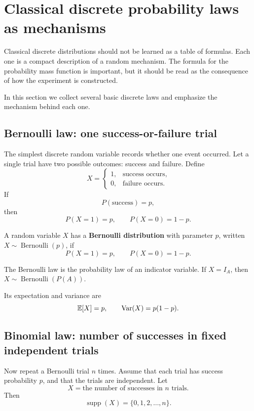 \section{Classical discrete probability laws as mechanisms}

Classical discrete distributions should not be learned as a table of formulas.
Each one is a compact description of a random mechanism. The formula for the
probability mass function is important, but it should be read as the consequence
of how the experiment is constructed.

In this section we collect several basic discrete laws and emphasize the
mechanism behind each one.

\subsection*{Bernoulli law: one success-or-failure trial}

The simplest discrete random variable records whether one event occurred. Let a
single trial have two possible outcomes: success and failure. Define
\[
X=
\begin{cases}
1, & \text{success occurs},\\
0, & \text{failure occurs}.
\end{cases}
\]
If
\[
P(\text{success})=p,
\]
then
\[
P(X=1)=p,\qquad P(X=0)=1-p.
\]

\begin{definitionbox}
A random variable \(X\) has a \textbf{Bernoulli distribution} with parameter
\(p\), written \(X\sim\operatorname{Bernoulli}(p)\), if
\[
P(X=1)=p,\qquad P(X=0)=1-p.
\]
\end{definitionbox}

The Bernoulli law is the probability law of an indicator variable. If \(X=I_A\),
then \(X\sim\operatorname{Bernoulli}(P(A))\).

Its expectation and variance are
\[
\mathbb{E}[X]=p,\qquad \operatorname{Var}(X)=p(1-p).
\]

\subsection*{Binomial law: number of successes in fixed independent trials}

Now repeat a Bernoulli trial \(n\) times. Assume that each trial has success
probability \(p\), and that the trials are independent. Let
\[
X=\text{the number of successes in }n\text{ trials}.
\]
Then
\[
\operatorname{supp}(X)=\{0,1,2,\ldots,n\}.
\]

